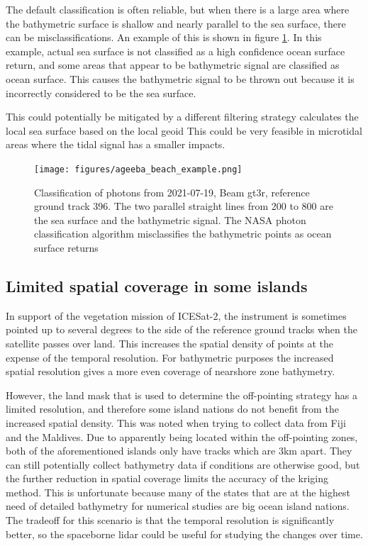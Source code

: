 The default classification is often reliable, but when there is a large area where the bathymetric surface is shallow and nearly parallel to the sea surface, there can be misclassifications. An example of this is shown in figure \ref{fig:ageeba_bad_classes}. In this example, actual sea surface is not classified as a high confidence ocean surface return, and some areas that appear to be bathymetric signal are classified as ocean surface. This causes the bathymetric signal to be thrown out because it is incorrectly considered to be the sea surface.

This could potentially be mitigated by a different filtering strategy calculates the local sea surface based on the local geoid  This could be very feasible in microtidal areas where the tidal signal has a smaller impacts.

\begin{figure}[htbp]
    \centering
    \texttt{[image: figures/ageeba\_beach\_example.png]}
    \caption{Classification of photons from 2021-07-19, Beam gt3r, reference ground track 396. The two parallel straight lines from 200 to 800 are the sea surface and the bathymetric signal. The NASA photon classification algorithm misclassifies the bathymetric points as ocean surface returns}
    \label{fig:ageeba_bad_classes}
\end{figure}


\subsection{Limited spatial coverage in some islands}

In support of the vegetation mission of ICESat-2, the instrument is sometimes pointed up to several degrees to the side of the reference ground tracks when the satellite passes over land. This increases the spatial density of points at the expense of the temporal resolution. For bathymetric purposes the increased spatial resolution gives a more even  coverage of nearshore zone bathymetry. 

However, the land mask that is used to determine the off-pointing strategy has a limited resolution, and therefore some island nations do not benefit from the increased spatial density. This was noted when trying to collect data from Fiji and the Maldives. Due to apparently being located within the off-pointing zones, both of the aforementioned islands only have tracks which are 3km apart. They can still potentially collect bathymetry data if conditions are otherwise good, but the further reduction in spatial coverage limits the accuracy of the kriging method. This is unfortunate because many of the states that are at the highest need of detailed bathymetry for numerical studies are big ocean island nations. The tradeoff for this scenario is that the temporal resolution is significantly better, so the spaceborne lidar could be useful for studying the changes over time. 

